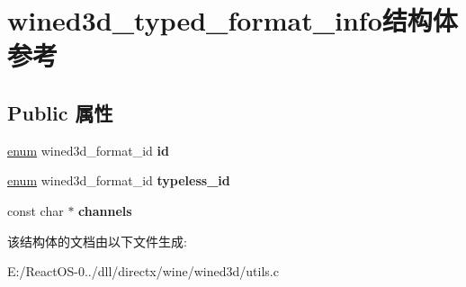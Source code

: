 \hypertarget{structwined3d__typed__format__info}{}\section{wined3d\+\_\+typed\+\_\+format\+\_\+info结构体 参考}
\label{structwined3d__typed__format__info}
\subsection*{Public 属性}
\begin{DoxyCompactItemize}
\item 
\mbox{\label{structwined3d__typed__format__info_a5fd6ee7e06f631be09cb14dd3484e6b4}} 
\hyperlink{interfaceenum}{enum} wined3d\+\_\+format\+\_\+id {\bfseries id}
\item 
\mbox{\label{structwined3d__typed__format__info_a78b59f1f749aed6e516e70b1ed96a9f6}} 
\hyperlink{interfaceenum}{enum} wined3d\+\_\+format\+\_\+id {\bfseries typeless\+\_\+id}
\item 
\mbox{\label{structwined3d__typed__format__info_aa554c56da81d0f623e85d3a5cea49f63}} 
const char $\ast$ {\bfseries channels}
\end{DoxyCompactItemize}


该结构体的文档由以下文件生成\+:\begin{DoxyCompactItemize}
\item 
E\+:/\+React\+O\+S-\/0../dll/directx/wine/wined3d/utils.\+c\end{DoxyCompactItemize}

